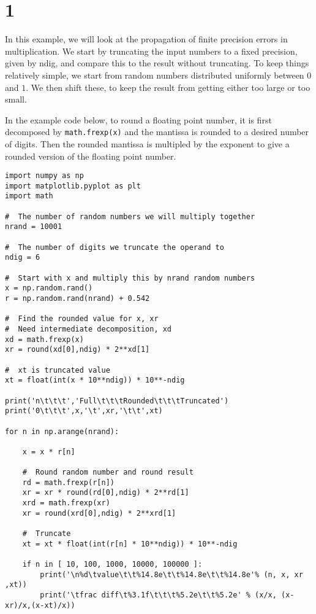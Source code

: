 \section{1}\label{sec:q1}

In this example, we will look at the propagation of finite precision errors in
multiplication. We start by truncating the input numbers to a fixed precision, given by
ndig, and compare this to the result without truncating. To keep things relatively simple,
we start from random numbers distributed uniformly between $0$ and $1$. We then shift these,
to keep the result from getting either too large or too small.

In the example code below, to round a floating point number, it is first decomposed by
\texttt{math.frexp(x)} and the mantissa is rounded to a desired number of digits. Then the
rounded mantissa is multipled by the exponent to give a rounded version of the floating
point number.

\begin{verbatim}
import numpy as np
import matplotlib.pyplot as plt
import math

#  The number of random numbers we will multiply together
nrand = 10001

#  The number of digits we truncate the operand to
ndig = 6

#  Start with x and multiply this by nrand random numbers
x = np.random.rand()
r = np.random.rand(nrand) + 0.542

#  Find the rounded value for x, xr
#  Need intermediate decomposition, xd
xd = math.frexp(x)
xr = round(xd[0],ndig) * 2**xd[1]

#  xt is truncated value
xt = float(int(x * 10**ndig)) * 10**-ndig

print('n\t\t\t','Full\t\t\tRounded\t\t\tTruncated')
print('0\t\t\t',x,'\t',xr,'\t\t',xt)

for n in np.arange(nrand):

    x = x * r[n]

    #  Round random number and round result
    rd = math.frexp(r[n])
    xr = xr * round(rd[0],ndig) * 2**rd[1]
    xrd = math.frexp(xr)
    xr = round(xrd[0],ndig) * 2**xrd[1]

    #  Truncate
    xt = xt * float(int(r[n] * 10**ndig)) * 10**-ndig

    if n in [ 10, 100, 1000, 10000, 100000 ]:
        print('\n%d\tvalue\t\t%14.8e\t\t%14.8e\t\t%14.8e'% (n, x, xr ,xt))
        print('\tfrac diff\t%3.1f\t\t\t%5.2e\t\t%5.2e' % (x/x, (x-xr)/x,(x-xt)/x))
\end{verbatim}

